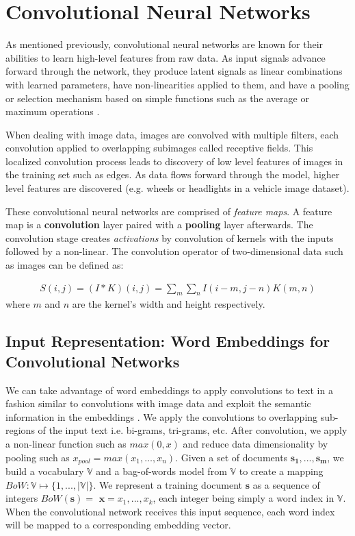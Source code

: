 \section{Convolutional Neural Networks}
As mentioned previously, convolutional neural networks are known for their abilities to learn high-level features from raw data. As input signals advance
forward through the network, they produce latent signals as linear combinations with learned parameters, have non-linearities applied
to them, and have a pooling or selection mechanism based on simple functions such as the average or maximum operations \cite{zhou1988image}.

When dealing with image data, images are convolved with multiple filters, each convolution applied to overlapping subimages called receptive fields.
This localized convolution process leads to discovery of low level features of images in the training set such as edges. As data
flows forward through the model, higher level features are discovered (e.g. wheels or headlights in a vehicle image dataset).

These convolutional neural networks are comprised of \textit{feature maps}. A feature map is a \textbf{convolution} layer paired with a
\textbf{pooling} layer afterwards. The convolution stage creates \textit{activations} by convolution of kernels with the inputs followed by a non-linear.
The convolution operator of two-dimensional data such as images can be defined as:

\[\begin{aligned}
S(i,j) = (I \ast K)(i,j)
= \sum_{m} \sum_{n} I(i-m,j-n)K(m,n)
\end{aligned}\]
where $m$ and $n$ are the kernel's width and height respectively.




\subsection{Input Representation: Word Embeddings for Convolutional Networks}
We can take advantage of word embeddings to apply convolutions to text in a fashion similar to convolutions with
image data and exploit the semantic information in the embeddings \cite{kim2014convolutional}. We apply the convolutions to overlapping sub-regions of the input text i.e. bi-grams, tri-grams, etc.
After convolution, we apply a non-linear function such as $max(0,x)$ and reduce data dimensionality
by pooling such as $x_{pool} = max(x_1,\dots,x_n)$.
Given a set of documents $\bm{s_1},...,\bm{s_m}$, we build a vocabulary $\mathbb{V}$ and a bag-of-words model from $\mathbb{V}$ to create a mapping $BoW:\mathbb{V} \mapsto \{1,...,|\mathbb{V}|\}$.
We represent a training document $\bm{s}$ as a sequence of integers $BoW(\bm{s})=$ $\bm{x} = x_1,...,x_k$, each integer being simply a word index
in $\mathbb{V}$. When the convolutional network receives this input sequence, each word index will be mapped to a corresponding embedding vector.

